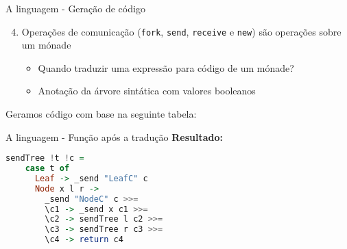 \begin{frame}[fragile]{A linguagem - Geração de código}
  \begin{enumerate}
    \setcounter{enumi}{3}  
  \item Operações de comunicação (\lstinline|fork|, \lstinline|send|, \lstinline|receive| e \lstinline|new|) são operações sobre um mónade
    \begin{itemize}
    \item Quando traduzir uma expressão para código de um mónade?
    \item Anotação da árvore sintática com valores booleanos
    \end{itemize}
  \end{enumerate}
  Geramos código com base na seguinte tabela:
  \vskip 0.2cm
\end{frame}

\begin{frame}[fragile]{A linguagem - Função após a tradução}
  \textbf{Resultado:}
  \vskip 0.5cm
  \begin{lstlisting}[language=Haskell]
  sendTree !t !c =
    case t of 
      Leaf -> _send "LeafC" c 
      Node x l r ->
        _send "NodeC" c >>=
        \c1 -> _send x c1 >>=
        \c2 -> sendTree l c2 >>=
        \c3 -> sendTree r c3 >>=
        \c4 -> return c4 
   \end{lstlisting}
\end{frame}



